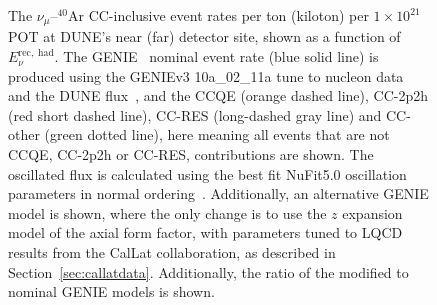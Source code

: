 \documentclass{ar-1col}
\begin{document}
\begin{figure}[htbp]
  \centering
  \hspace{75pt}
  \vspace{11pt}
  \caption{The $\nu_{\mu}$--$^{40}$Ar CC-inclusive event rates per ton (kiloton) per $1\times10^{21}$POT at DUNE's near (far) detector site, shown as a function of $E^{\mathrm{rec,\;had}}_{\nu}$. The GENIE~\cite{Andreopoulos:2009rq, GENIE:2021npt} nominal event rate (blue solid line) is produced using the GENIEv3 10a\_02\_11a tune to nucleon data~\cite{GENIE:2021zuu} and the DUNE flux~\cite{Abi:2020evt}, and the CCQE (orange dashed line), CC-2p2h (red short dashed line), CC-RES (long-dashed gray line) and CC-other (green dotted line), here meaning all events that are not CCQE, CC-2p2h or CC-RES, contributions are shown. The oscillated flux is calculated using the best fit NuFit5.0 oscillation parameters in normal ordering~\cite{Esteban:2020cvm, nufitweb}. Additionally, an alternative GENIE model is shown, where the only change is to use the $z$ expansion model of the axial form factor, with parameters tuned to LQCD results from the CalLat collaboration, as described in Section~\ref{sec:callatdata}. Additionally, the ratio of the modified to nominal GENIE models is shown.}
  \label{fig:dune_impact}
\end{figure}
\end{document}

